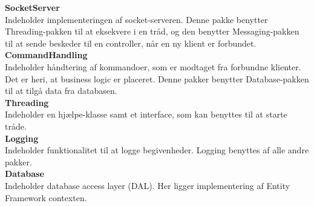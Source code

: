 \textbf{SocketServer}\\
Indeholder implementeringen af socket-serveren. Denne pakke benytter Threading-pakken til at eksekvere i en tråd, og den benytter Messaging-pakken til at sende beskeder til en controller, når en ny klient er forbundet.\\

\textbf{CommandHandling}\\
Indeholder håndtering af kommandoer, som er modtaget fra forbundne klienter. Det er heri, at business logic er placeret. Denne pakker benytter Database-pakken til at tilgå data fra databasen.\\

\textbf{Threading}\\
Indeholder en hjælpe-klasse samt et interface, som kan benyttes til at starte tråde.\\

\textbf{Logging}\\
Indeholder funktionalitet til at logge begivenheder. Logging benyttes af alle andre pakker.\\

\textbf{Database}\\
Indeholder database access layer (DAL). Her ligger implementering af Entity Framework contexten.